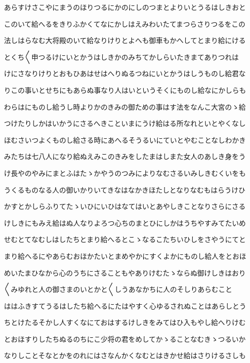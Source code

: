 \documentclass[a4paper,11pt,landscape]{ltjtarticle}
\begin{document}
あらすけさこやにまうのほりつるにかのにしのつまとよりいとうるはしきおと
\par\medskip
このいて給へるをきりふかくてなにかしはえみわいたてまつらさりつるをこの
\par\medskip
法しはらなむ大将殿のいて給なりけりとよへも御車もかへしてとまり給にける
\par\medskip
とくち〱申つるけにいとかうはしきかのみちてかしらいたきまてありつれは
\par\medskip
けにさなりけりとおもひあはせはへりぬるつねにいとかうはしうものし給君な
\par\medskip
りこの事いとせちにもあらぬ事なり人はいというそくにものし給なにかしらも
\par\medskip
わらはにものし給うし時よりかのきみの御ための事はす法をなんこ大宮のゝ給
\par\medskip
つけたりしかはいかうにさるへきこといまにうけ給はる所なれといとやくなし
\par\medskip
ほむさいつよくものし給さる時にあへるそうるいにていとやむことなしわかき
\par\medskip
みたちは七八人になり給ぬえみこのきみをしたまはしまた女人のあしき身をう
\par\medskip
け長やのやみにまとふはたゝかやうのつみによりなむさるいみしきむくいをも
\par\medskip
うくるものなる人の御いかりいてきなはなかきほたしとなりなむもはらうけひ
\par\medskip
かすとかしらふりてたゝいひにいひはなてはいとあやしきことなりさらにさる
\par\medskip
けしきにもみえ給はぬ人なりよろつ心ちのまとひにしかはうちやすみてたいめ
\par\medskip
せむとてなむしはしたちとまり給へるとこゝなるこたちいひしをさやうにてと
\par\medskip
まり給へるにやあらむおほかたいとまめやかにすくよかにものし給人をとおほ
\par\medskip
めいたまひなから心のうちにさることもやありけむたゝならぬ御けしきはおり
\par\medskip
〱みゆれと人の御さまのいとかと〱しうあなかちに人のそしりあらむこと
\par\medskip
ははふきすてうるはしたち給へるにたはやすく心ゆるされぬことはあらしとう
\par\medskip
ちとけたるそかし人すくなにておはするけしきをみてはひ入もやし給へりけむ
\par\medskip
とおほすりしたちぬるのちにこ少将の君をめしてかゝることなむきゝつるいか
\par\medskip
なりしことそなとかをのれにはさなんかくなむとはきかせ給はさりけるさしも
\end{document}
